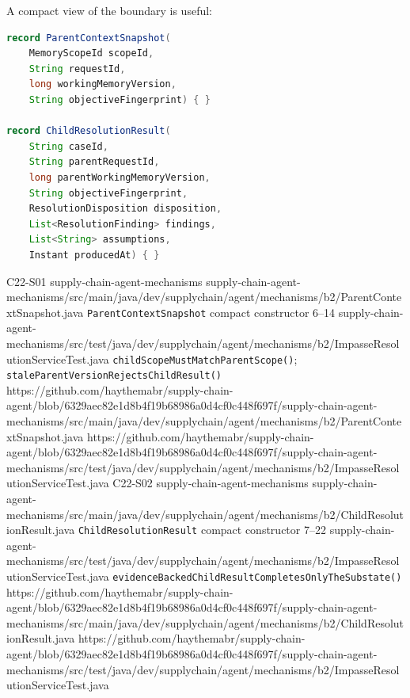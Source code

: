 A compact view of the boundary is useful:

\begin{minipage}{\linewidth}
\begin{lstlisting}[language=Java,caption={The parent snapshot and child result identify a return boundary without copying the parent objective or granting child capabilities.},label={lst:ch22-parent-result-contract}]
record ParentContextSnapshot(
    MemoryScopeId scopeId,
    String requestId,
    long workingMemoryVersion,
    String objectiveFingerprint) { }

record ChildResolutionResult(
    String caseId,
    String parentRequestId,
    long parentWorkingMemoryVersion,
    String objectiveFingerprint,
    ResolutionDisposition disposition,
    List<ResolutionFinding> findings,
    List<String> assumptions,
    Instant producedAt) { }
\end{lstlisting}
\BookSourceReferenceNoQR
  {C22-S01}
  {supply-chain-agent-mechanisms}
  {supply-chain-agent-mechanisms/src/main/java/dev/supplychain/agent/mechanisms/b2/ParentContextSnapshot.java}
  {\texttt{ParentContextSnapshot} compact constructor}
  {6--14}
  {supply-chain-agent-mechanisms/src/test/java/dev/supplychain/agent/mechanisms/b2/ImpasseResolutionServiceTest.java}
  {\texttt{childScopeMustMatchParentScope()}; \texttt{staleParentVersionRejectsChildResult()}}
  {https://github.com/haythemabr/supply-chain-agent/blob/6329aec82e1d8b4f19b68986a0d4cf0c448f697f/supply-chain-agent-mechanisms/src/main/java/dev/supplychain/agent/mechanisms/b2/ParentContextSnapshot.java}
  {https://github.com/haythemabr/supply-chain-agent/blob/6329aec82e1d8b4f19b68986a0d4cf0c448f697f/supply-chain-agent-mechanisms/src/test/java/dev/supplychain/agent/mechanisms/b2/ImpasseResolutionServiceTest.java}
\BookSourceReferenceNoQR
  {C22-S02}
  {supply-chain-agent-mechanisms}
  {supply-chain-agent-mechanisms/src/main/java/dev/supplychain/agent/mechanisms/b2/ChildResolutionResult.java}
  {\texttt{ChildResolutionResult} compact constructor}
  {7--22}
  {supply-chain-agent-mechanisms/src/test/java/dev/supplychain/agent/mechanisms/b2/ImpasseResolutionServiceTest.java}
  {\texttt{evidenceBackedChildResultCompletesOnlyTheSubstate()}}
  {https://github.com/haythemabr/supply-chain-agent/blob/6329aec82e1d8b4f19b68986a0d4cf0c448f697f/supply-chain-agent-mechanisms/src/main/java/dev/supplychain/agent/mechanisms/b2/ChildResolutionResult.java}
  {https://github.com/haythemabr/supply-chain-agent/blob/6329aec82e1d8b4f19b68986a0d4cf0c448f697f/supply-chain-agent-mechanisms/src/test/java/dev/supplychain/agent/mechanisms/b2/ImpasseResolutionServiceTest.java}
\end{minipage}

